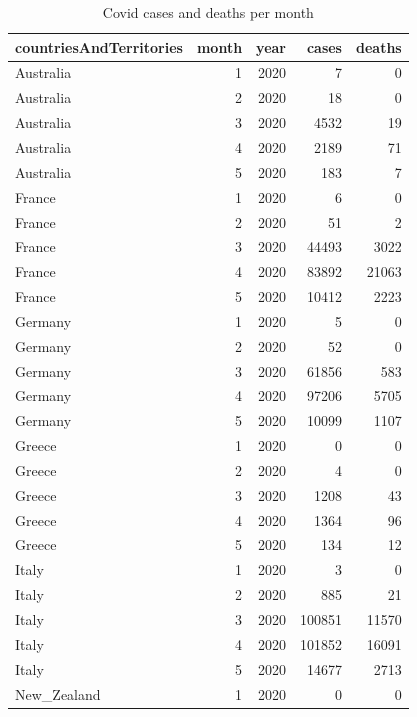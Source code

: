 \documentclass[11pt,a4paper,]{article}
\begin{document}
\clearpage

\begin{table}[!h]

\caption{\label{tab:covidtab}Covid cases and deaths per month}
\centering
\begin{tabular}[t]{lrrrr}
\toprule
countriesAndTerritories & month & year & cases & deaths\\
\midrule
\rowcolor{gray!6}  Australia & 1 & 2020 & 7 & 0\\
Australia & 2 & 2020 & 18 & 0\\
\rowcolor{gray!6}  Australia & 3 & 2020 & 4532 & 19\\
Australia & 4 & 2020 & 2189 & 71\\
\rowcolor{gray!6}  Australia & 5 & 2020 & 183 & 7\\
\addlinespace
France & 1 & 2020 & 6 & 0\\
\rowcolor{gray!6}  France & 2 & 2020 & 51 & 2\\
France & 3 & 2020 & 44493 & 3022\\
\rowcolor{gray!6}  France & 4 & 2020 & 83892 & 21063\\
France & 5 & 2020 & 10412 & 2223\\
\addlinespace
\rowcolor{gray!6}  Germany & 1 & 2020 & 5 & 0\\
Germany & 2 & 2020 & 52 & 0\\
\rowcolor{gray!6}  Germany & 3 & 2020 & 61856 & 583\\
Germany & 4 & 2020 & 97206 & 5705\\
\rowcolor{gray!6}  Germany & 5 & 2020 & 10099 & 1107\\
\addlinespace
Greece & 1 & 2020 & 0 & 0\\
\rowcolor{gray!6}  Greece & 2 & 2020 & 4 & 0\\
Greece & 3 & 2020 & 1208 & 43\\
\rowcolor{gray!6}  Greece & 4 & 2020 & 1364 & 96\\
Greece & 5 & 2020 & 134 & 12\\
\addlinespace
\rowcolor{gray!6}  Italy & 1 & 2020 & 3 & 0\\
Italy & 2 & 2020 & 885 & 21\\
\rowcolor{gray!6}  Italy & 3 & 2020 & 100851 & 11570\\
Italy & 4 & 2020 & 101852 & 16091\\
\rowcolor{gray!6}  Italy & 5 & 2020 & 14677 & 2713\\
\addlinespace
New\_Zealand & 1 & 2020 & 0 & 0\\

\end{tabular}
\end{table}
\end{document}

